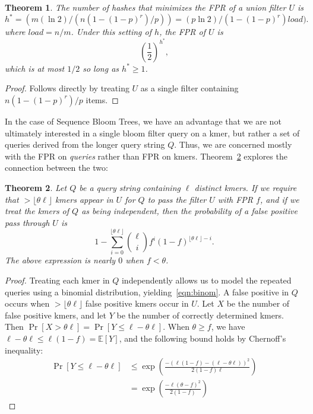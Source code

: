 \documentclass[11pt]{article}
\newtheorem{thm}{Theorem}
\newcommand\EE{\mathbb{E}}
\begin{document}
\begin{thm}\label{lem:hash}
The  number of hashes that minimizes the FPR of a union filter $U$ is
\begin{equation}
h^* = (m (\ln 2) / (n(1-(1-p)^r)/p)) = 
(p\ln 2) / (1-(1-p)^r)\textit{load}).
\end{equation}
where $\textit{load} = n / m$.
Under this setting of $h$, the FPR of $U$ is 
\begin{equation}
\left(\frac{1}{2}\right)^{h^*},
\end{equation}
which is at most $1/2$ so long as $h^* \geq 1$.
\end{thm}
\begin{proof}
Follows directly by treating $U$ as a single filter containing $n(1-(1-p)^r)/p$ items.
\end{proof}

In the case of Sequence Bloom Trees, we have an advantage that we are not ultimately interested in a single bloom filter query on a kmer, but rather a set of queries derived from the longer query string $Q$.  Thus, we are concerned mostly with the FPR on \emph{queries} rather than FPR on kmers. Theorem~\ref{lem:query} explores the connection between the two:

\begin{thm}\label{lem:query}
Let $Q$ be a query string containing $\ell$ distinct kmers. If we require that $>\lfloor\theta\ell\rfloor$ kmers appear in $U$ for $Q$ to pass the filter $U$ with FPR $f$, and if we treat the kmers of $Q$ as being independent, then the probability of a false positive pass through $U$ is
\begin{equation}\label{eqn:binom}
1 - \sum_{i=0}^{\lfloor \theta\ell\rfloor} \binom{\ell}{i}f^i(1-f)^{\lfloor\theta\ell\rfloor - i}. 
\end{equation}
The above expression is nearly $0$ when $f < \theta$.  
\end{thm}
\begin{proof}
Treating each kmer in $Q$ independently allows us to model the repeated queries using a binomial distribution, yielding~\eqref{eqn:binom}. A false positive in $Q$ occurs when $> \lfloor \theta \ell \rfloor$ false positive kmers occur in $U$. Let $X$ be the number of false positive kmers, and let $Y$ be the number of correctly determined kmers. Then
$\Pr[X > \theta\ell] = \Pr[Y \leq \ell - \theta\ell]$.
When $\theta \geq f$, we have $\ell - \theta\ell \leq \ell (1-f) = \EE[Y]$, and the following bound holds by Chernoff's inequality:
\begin{align}
\Pr[Y \leq \ell - \theta\ell] 
	&\leq \exp\left(\frac{-(\ell(1-f) - (\ell-\theta\ell))^2}{2(1-f)\ell}\right)\\
	&= \exp\left(\frac{-\ell(\theta - f)^2}{2(1-f)}\right)
\end{align}
\end{proof}
\end{document}

